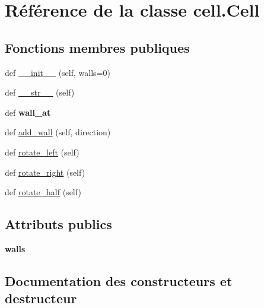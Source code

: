 \hypertarget{classcell_1_1Cell}{}\section{Référence de la classe cell.\+Cell}
\label{classcell_1_1Cell}
\subsection*{Fonctions membres publiques}
\begin{DoxyCompactItemize}
\item 
def \hyperlink{classcell_1_1Cell_aa73d66bb2f737b9845e221a0f6974f2a}{\+\_\+\+\_\+init\+\_\+\+\_\+} (self, walls=0)
\item 
def \hyperlink{classcell_1_1Cell_a8f5a44a2e36ebbcf8c0978cb7dc888f1}{\+\_\+\+\_\+str\+\_\+\+\_\+} (self)
\item 
\mbox{\label{classcell_1_1Cell_a35036440271aede1f6bc682bd1124dbc}} 
def {\bfseries wall\+\_\+at}
\item 
def \hyperlink{classcell_1_1Cell_a73e53012b8b7e114778e08e38c2524a6}{add\+\_\+wall} (self, direction)
\item 
def \hyperlink{classcell_1_1Cell_afe4fd9eff1237decc36d388600897f75}{rotate\+\_\+left} (self)
\item 
def \hyperlink{classcell_1_1Cell_a46fe2e7a6559049679f9e93e13abea79}{rotate\+\_\+right} (self)
\item 
def \hyperlink{classcell_1_1Cell_a85bf248bab5f2fb81ab4498ec025e138}{rotate\+\_\+half} (self)
\end{DoxyCompactItemize}
\subsection*{Attributs publics}
\begin{DoxyCompactItemize}
\item 
\mbox{\label{classcell_1_1Cell_a20ad036dab954ec1035d26794a23a71d}} 
{\bfseries walls}
\end{DoxyCompactItemize}


\subsection{Documentation des constructeurs et destructeur}
\mbox{\label{classcell_1_1Cell_aa73d66bb2f737b9845e221a0f6974f2a}} 
